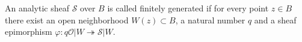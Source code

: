 An analytic sheaf $\mathcal{S}$ over $B$ is called finitely generated if for every point $z \in B$ there exist an open neighborhood $W(z) \subset B$, a natural number $q$ and a sheaf epimorphism $\varphi: q\mathcal{O}|W \twoheadrightarrow \mathcal{S}|W$.
